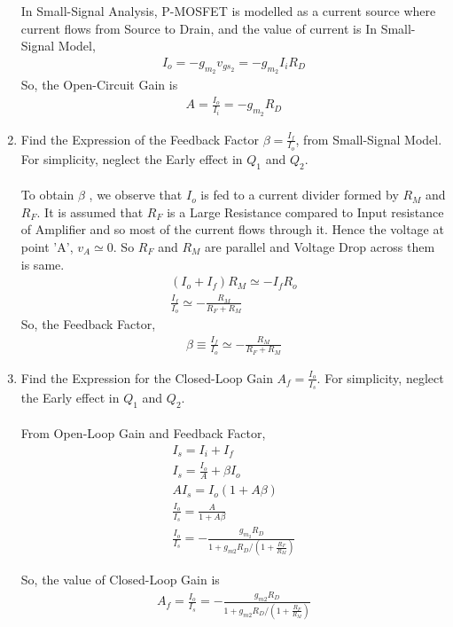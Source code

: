 \begin{enumerate}[label=\thesubsection.\arabic*.,ref=\thesubsection.\theenumi]
In Small-Signal Analysis, P-MOSFET is modelled as a current source where current flows from Source to Drain, and the value of current is
In Small-Signal Model,
\begin{align}
I_{o} =  -g_{m_{2}}v_{gs_{2}} = -g_{m_{2}}I_{i}R_{D}
\end{align}
So, the Open-Circuit Gain is
\begin{align}
A = \frac{I_{o}}{I_{i}} =  -g_{m_{2}}R_{D}
\end{align}
\item Find the Expression of the Feedback Factor $\beta = \frac{I_{f}}{I_{o}}$, from Small-Signal Model. For simplicity, neglect the Early effect in $Q_{1}$ and $Q_{2}$.\\
\solution \\
To obtain $\beta$ , we observe that $I_{o}$ is fed to a current divider formed by $R_{M}$ and $R_{F}$.
It is assumed that $R_{F}$ is a Large Resistance compared to Input resistance of Amplifier and so most of the current flows through it. Hence the voltage at point 'A', $v_{A} \simeq 0$. So $R_{F}$ and $R_{M}$ are parallel and Voltage Drop across them is same.
\begin{align}
(I_{o} + I_{f})R_{M} \simeq -I_{f}R_{o}\\
\frac{I_{f}}{I_{o}} \simeq -\frac{R_{M}}{R_{F}+R_{M}}
\end{align}
So, the Feedback Factor,
\begin{align}
\beta \equiv \frac{I_{f}}{I_{o}} \simeq-\frac{R_{M}}{R_{F}+R_{M}}
\end{align}
\item Find the Expression for the Closed-Loop Gain $A_{f}=\frac{I_{o}}{I_{s}}$. For simplicity, neglect the Early effect in $Q_{1}$ and $Q_{2}$.\\
\solution \\
From Open-Loop Gain and Feedback Factor,
\begin{align}
I_{s} = I_{i} + I_{f}\\
I_{s} = \frac{I_{o}}{A} + \beta I_{o}\\
AI_{s} = I_{o}(1+A\beta)\\
\frac{I_{o}}{I_{s}} = \frac{A}{1+A\beta}\\
\frac{I_{o}}{I_{s}}=-\frac{g_{m_{2}} R_{D}}{1+g_{m{2}} R_{D} /\left(1+\frac{R_{F}}{R_{M}}\right)}
\end{align}

So, the value of Closed-Loop Gain is
\begin{align}
A_{f} = \frac{I_{o}}{I_{s}}=-\frac{g_{m 2} R_{D}}{1+g_{m 2} R_{D} /\left(1+\frac{R_{F}}{R_{M}}\right)}
\end{align}

\end{enumerate}
